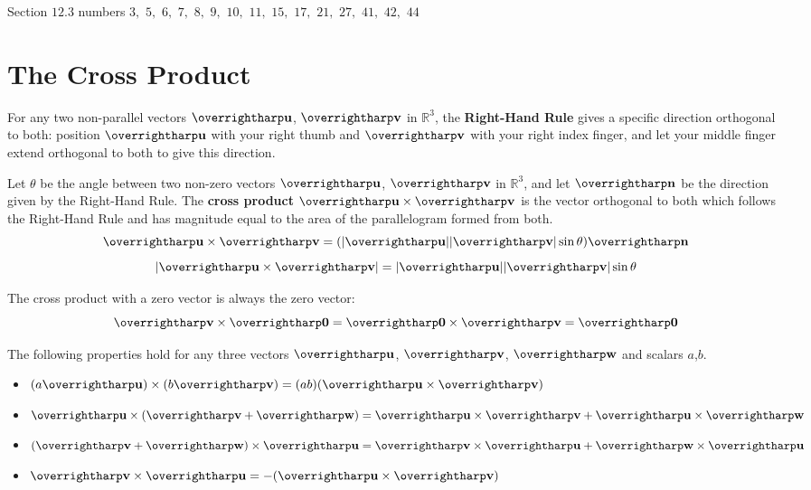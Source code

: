 \documentclass[letterpaper, twoside, 12pt]{book}
\begin{document}
\begin{suggestedHW}
Section $12.3$ numbers
$3,$ $5,$ $6,$ $7,$ $8,$ $9,$ $10,$ $11,$ $15,$ $17,$
$21,$ $27,$ $41,$ $42,$ $44$
\end{suggestedHW}





\section{The Cross Product}

\begin{definition}
  For any two non-parallel vectors $\harpvec{u}$, $\harpvec{v}$ in $\mathbb R^3$,
  the \textbf{Right-Hand Rule} gives a specific direction orthogonal to both:
  position $\harpvec{u}$ with your right thumb and $\harpvec{v}$ with your
  right index finger, and let your middle finger extend orthogonal to both
  to give this direction.
\end{definition}

\begin{definition}
  Let $\theta$ be the angle between two non-zero vectors $\harpvec{u}$,
  $\harpvec{v}$ in $\mathbb{R}^3$, and let $\harpvec{n}$ be the direction
  given by the Right-Hand Rule.
  The \textbf{cross product} $\harpvec{u}\times\harpvec{v}$ is the vector
  orthogonal to both which follows the Right-Hand Rule and has magnitude
  equal to the area of the parallelogram formed from both.
  \[
    \harpvec{u}\times\harpvec{v}
      =
    (|\harpvec{u}||\harpvec{v}|\sin\theta)\harpvec{n}
  \]
  \[
    |\harpvec{u}\times\harpvec{v}|
      =
    |\harpvec{u}||\harpvec{v}|\sin\theta
  \]
\end{definition}

\begin{definition}
  The cross product with a zero vector is always the zero vector:
  \[\harpvec{v}\times\harpvec{0}=\harpvec{0}\times\harpvec{v}=\harpvec{0}\]
\end{definition}

\begin{theorem}
  The following properties hold for any three vectors $\harpvec{u}$, $\harpvec{v}$,
  $\harpvec{w}$ and scalars $a$,$b$.
  \begin{itemize}
  \item $(a\harpvec{u}) \times (b\harpvec{v}) = (ab)(\harpvec{u} \times \harpvec{v})$
  \item
    $\harpvec{u} \times (\harpvec{v} + \harpvec{w}) =
    \harpvec{u} \times \harpvec{v} + \harpvec{u} \times \harpvec{w}$
  \item
    $(\harpvec{v} + \harpvec{w}) \times \harpvec{u} =
    \harpvec{v} \times \harpvec{u} + \harpvec{w} \times \harpvec{u}$
  \item $\harpvec{v} \times \harpvec{u} = -(\harpvec{u} \times \harpvec{v})$
  \end{itemize}
\end{theorem}
\end{document}
